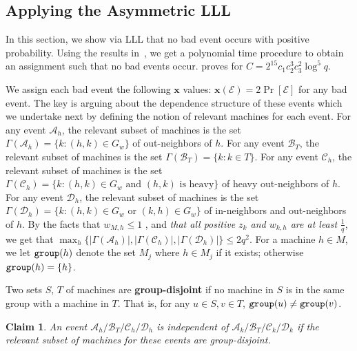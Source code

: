 \documentclass[11pt]{article}
\newenvironment{definition}{\begin{Definition}}{\end{Definition}}
\newtheorem{claim}{Claim}[section]
\newtheorem{definition}[lemma]{Definition}
\newtheorem{claim}[lemma]{Claim}
\newcommand{\set}[1]{\left\{#1\right\}}
\newcommand{\cA}{{\mathscr A}}
\newcommand{\cB}{\mathscr{B}}
\newcommand{\cC}{{\mathscr C}}
\newcommand{\cD}{\mathscr{D}}
\newcommand{\cE}{{\mathscr E}}
\newcommand{\x}{{\mathbf x}}
\begin{document}
\subsection{Applying the Asymmetric LLL}
In this section, we show via LLL that no bad event occurs with positive probability. Using the results in~\cite{MT10,HSS11}, we get a polynomial time procedure to obtain an assignment such that no bad events occur.  proves  for $C = 2^{15}c_1c_2^3c_3^2\log^5 q$.  

We assign each bad event the following $\x$ values: $\x(\cE) = 2\Pr[\cE]$ for any bad event. The key is arguing about the dependence structure of these events which we undertake next by defining the notion of relevant machines for each event.
For any event $\cA_h$,  the relevant subset of machines is the set $\Gamma(\cA_h) = \{k: (h,k)\in G_w\}$ of out-neighbors of $h$.  For any event $\cB_T$,  the relevant subset of machines is the set $\Gamma(\cB_T) = \{k: k\in T \}$. For any event $\cC_h$,  the relevant subset of machines is the set $\Gamma(\cC_h) = \{k: (h,k) \in G_w \text{ and } (h,k)  \text{ is heavy} \}$ of heavy out-neighbors of $h$.  For any event $\cD_h$,  the relevant subset of machines is the set $\Gamma(\cD_h) = \{k: (h,k) \in G_w \text{ or } (k,h) \in G_w \}$ of in-neighbors and out-neighbors of $h$. 
By the facts that $w_{M, h}\leq 1$ , and {\em that all positive $z_k$ and $w_{k,h}$ are at least} $\frac{1}{q}$, we get that
$\max_h \{ |\Gamma(\cA_h)|, |\Gamma(\cC_h)|, |\Gamma(\cD_h)| \} \leq 2q^2$. 
\def\group{{\tt group}}
For a machine $h\in M$, we let $\group(h)$ denote the set $M_j$ where $h\in M_j$ if it exists; otherwise $\group(h) = \set{h}$. 
\begin{definition}
Two sets $S$, $T$ of machines are {\bf group-disjoint} if no machine in $S$ is in the same group with a machine in $T$. That is, for any $u\in S, v \in T$, $\group(u) \neq \group(v)$.
\end{definition}

\begin{claim}
An event $\cA_h/\cB_T/\cC_h/\cD_h$ is independent of $\cA_k/\cB_{T}/\cC_k/\cD_k$ if the relevant subset of machines for these events are  group-disjoint.
\end{claim}
\end{document}
